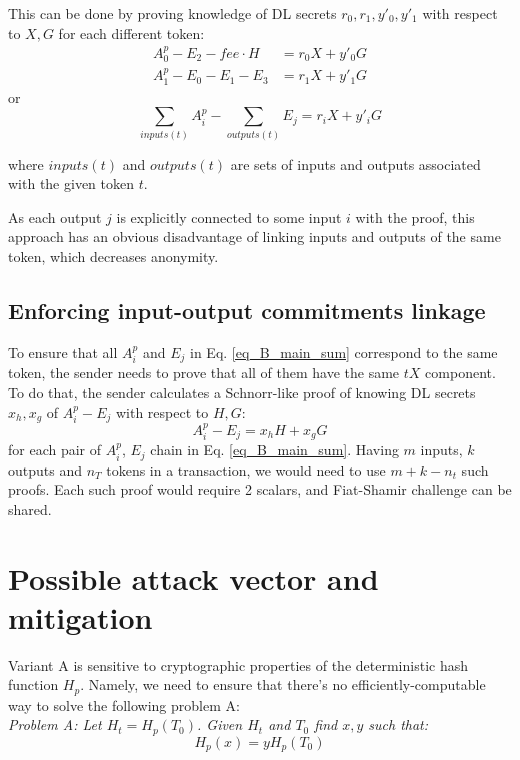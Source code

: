 \documentclass{article}
\begin{document}
This can be done by proving knowledge of DL secrets $r_0, r_1, y'_0, y'_1$ with respect to $X, G$ for each different token:
\begin{equation*}
    \begin{aligned}
    A^p_0 - E_2 - \textit{fee}\cdot H &= r_0 X + y'_0 G \\
    A^p_1 - E_0 - E_1 - E_3 &= r_1 X + y'_1 G 
    \end{aligned}
\end{equation*}
or
\begin{equation}\label{eq_B_main_sum}
    \sum_{inputs(t)}{A^p_i} - \sum_{outputs(t)}{E_j} = r_iX + y'_iG
\end{equation}

where $inputs(t)$ and $outputs(t)$ are sets of inputs and outputs associated with the given token $t$.

As each output $j$ is explicitly connected to some input $i$ with the proof, this approach has an obvious disadvantage of linking inputs and outputs of the same token, which decreases anonymity.


\subsection{Enforcing input-output commitments linkage}
To ensure that all $A^p_i$ and $E_j$ in Eq. \ref{eq_B_main_sum} correspond to the same token, the sender needs to prove that all of them have the same $tX$ component. To do that, the sender calculates a Schnorr-like proof of knowing DL secrets $x_h, x_g$ of $A^p_i - E_j$ with respect to $H, G$: 
\[
    A^p_i - E_j = x_hH + x_gG 
\]
for each pair of $A^p_i$, $E_j$ chain in Eq. \ref{eq_B_main_sum}. Having $m$ inputs, $k$ outputs and $n_T$ tokens in a transaction, we would need to use $m + k - n_t$ such proofs. Each such proof would require 2 scalars, and Fiat-Shamir challenge can be shared.

\newpage

\section{Possible attack vector and mitigation}
Variant A is sensitive to cryptographic properties of the deterministic hash function $H_p$. Namely, we need to ensure that there's no efficiently-computable way to solve the following problem A:\\

\textit{Problem A: Let $H_t = H_p(T_0)$. Given $H_t$ and $T_0$ find $x, y$ such that:
\[ H_p(x) = y H_p(T_0) \] }
\end{document}
